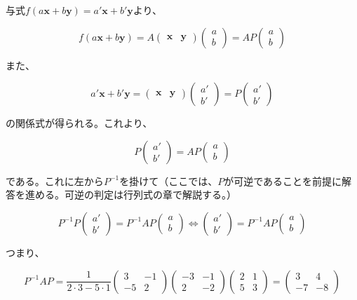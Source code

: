 \documentclass[dvipdfmx,autodetect-engine]{jsarticle}
\begin{document}
与式$f(a\bm{x} + b\bm{y}) = a'\bm{x} + b'\bm{y}$より、

$$
f(a\bm{x} + b\bm{y}) = A\begin{pmatrix} \bm{x} & \bm{y} \end{pmatrix}
\begin{pmatrix}
a \\
b
\end{pmatrix} = 
AP\begin{pmatrix}
a \\
b
\end{pmatrix}
$$

また、

$$
a'\bm{x} + b'\bm{y} = 
\begin{pmatrix}
\bm{x} & \bm{y}
\end{pmatrix}
\begin{pmatrix}
a' \\
b'
\end{pmatrix} =
P\begin{pmatrix}
a' \\
b'
\end{pmatrix}
$$

の関係式が得られる。これより、

$$
P\begin{pmatrix}
a' \\
b'
\end{pmatrix} = 
AP\begin{pmatrix}
a \\
b
\end{pmatrix}
$$

である。これに左から$P^{-1}$を掛けて（ここでは、$P$が可逆であることを前提に解答を進める。可逆の判定は行列式の章で解説する。）

$$
P^{-1}P\begin{pmatrix}
a' \\
b'
\end{pmatrix} =
P^{-1}AP\begin{pmatrix}
a \\
b
\end{pmatrix}
\Longleftrightarrow
\begin{pmatrix}
a' \\
b'
\end{pmatrix} =
P^{-1}AP\begin{pmatrix}
a \\
b
\end{pmatrix}
$$

つまり、

$$
P^{-1}AP = 
\frac{1}{2 \cdot 3 -5 \cdot 1}\begin{pmatrix}
3 & -1 \\
-5 & 2
\end{pmatrix}
\begin{pmatrix}
-3 & -1 \\
2 & -2
\end{pmatrix}
\begin{pmatrix}
2 & 1 \\
5 & 3
\end{pmatrix} = 
\begin{pmatrix}
3 & 4 \\
-7 & -8
\end{pmatrix}
$$
\end{document}
